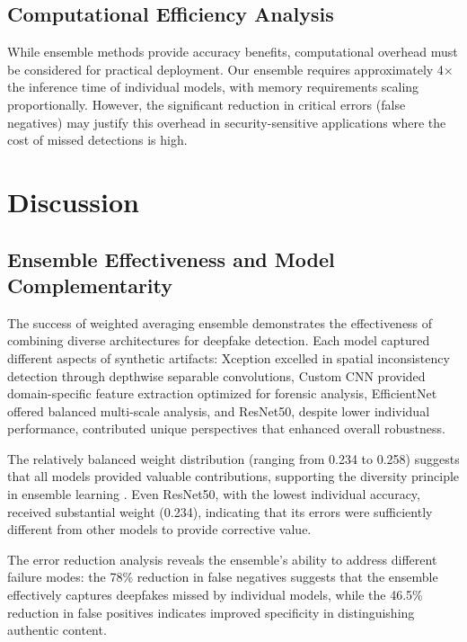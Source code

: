 \documentclass[conference]{IEEEtran}
\begin{document}
\subsection{Computational Efficiency Analysis}

While ensemble methods provide accuracy benefits, computational overhead must be considered for practical deployment. Our ensemble requires approximately 4× the inference time of individual models, with memory requirements scaling proportionally. However, the significant reduction in critical errors (false negatives) may justify this overhead in security-sensitive applications where the cost of missed detections is high.

\section{Discussion}

\subsection{Ensemble Effectiveness and Model Complementarity}

The success of weighted averaging ensemble demonstrates the effectiveness of combining diverse architectures for deepfake detection. Each model captured different aspects of synthetic artifacts: Xception excelled in spatial inconsistency detection through depthwise separable convolutions, Custom CNN provided domain-specific feature extraction optimized for forensic analysis, EfficientNet offered balanced multi-scale analysis, and ResNet50, despite lower individual performance, contributed unique perspectives that enhanced overall robustness.

The relatively balanced weight distribution (ranging from 0.234 to 0.258) suggests that all models provided valuable contributions, supporting the diversity principle in ensemble learning \cite{brown2005diversity}. Even ResNet50, with the lowest individual accuracy, received substantial weight (0.234), indicating that its errors were sufficiently different from other models to provide corrective value.

The error reduction analysis reveals the ensemble's ability to address different failure modes: the 78\% reduction in false negatives suggests that the ensemble effectively captures deepfakes missed by individual models, while the 46.5\% reduction in false positives indicates improved specificity in distinguishing authentic content.
\end{document}
